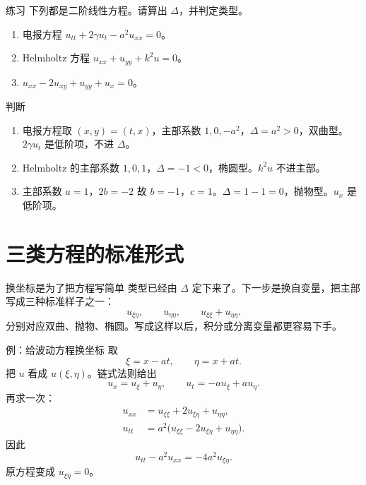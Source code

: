 \documentclass[fontset=windows, chinese, 10pt, xcolor=dvipsnames]{beamer}
\begin{document}
\begin{frame}{练习}
  下列都是二阶线性方程。请算出 $\Delta$，并判定类型。
  \vspace{0.4em}
  \begin{enumerate}
    \item 电报方程
      $u_{tt}+2\gamma u_t-a^2 u_{xx}=0$。
    \item Helmholtz 方程
      $u_{xx}+u_{yy}+k^2 u=0$。
    \item
      $u_{xx}-2u_{xy}+u_{yy}+u_x=0$。
  \end{enumerate}
\end{frame}

\begin{frame}{判断}
  \begin{enumerate}
    \item 电报方程取 $(x,y)=(t,x)$，主部系数 $1,0,-a^2$，$\Delta=a^2>0$，双曲型。$2\gamma u_t$ 是低阶项，不进 $\Delta$。
    \item Helmholtz 的主部系数 $1,0,1$，$\Delta=-1<0$，椭圆型。$k^2 u$ 不进主部。
    \item 主部系数 $a=1$，$2b=-2$ 故 $b=-1$，$c=1$。$\Delta=1-1=0$，抛物型。$u_x$ 是低阶项。
  \end{enumerate}
\end{frame}

\section{三类方程的标准形式}

\begin{frame}{换坐标是为了把方程写简单}
  类型已经由 $\Delta$ 定下来了。下一步是换自变量，把主部写成三种标准样子之一：
  \begin{equation*}
    u_{\xi\eta},\qquad
    u_{\eta\eta},\qquad
    u_{\xi\xi}+u_{\eta\eta}.
  \end{equation*}
  分别对应双曲、抛物、椭圆。写成这样以后，积分或分离变量都更容易下手。
  \vspace{0.35em}
\end{frame}

\begin{frame}{例：给波动方程换坐标}
  取
  \begin{equation*}
    \xi=x-at,\qquad \eta=x+at.
  \end{equation*}
  把 $u$ 看成 $u(\xi,\eta)$。链式法则给出
  \begin{equation*}
    u_x=u_\xi+u_\eta,
    \qquad
    u_t=-a u_\xi+a u_\eta.
  \end{equation*}
  再求一次：
  \begin{align*}
    u_{xx}&=u_{\xi\xi}+2u_{\xi\eta}+u_{\eta\eta},\\
    u_{tt}&=a^2\bigl(u_{\xi\xi}-2u_{\xi\eta}+u_{\eta\eta}\bigr).
  \end{align*}
  因此
  \begin{equation*}
    u_{tt}-a^2 u_{xx}=-4a^2 u_{\xi\eta}.
  \end{equation*}
  原方程变成 $u_{\xi\eta}=0$。
\end{frame}
\end{document}
